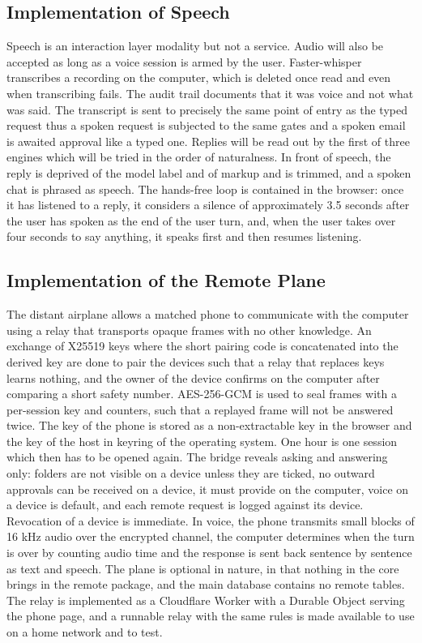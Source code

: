 \documentclass{FastFyp}
\begin{document}
\subsection{Implementation of Speech}
Speech is an interaction layer modality but not a service. Audio will also be accepted as long as a voice session is armed by the user. Faster-whisper transcribes a recording on the computer, which is deleted once read and even when transcribing fails. The audit trail documents that it was voice and not what was said. The transcript is sent to precisely the same point of entry as the typed request thus a spoken request is subjected to the same gates and a spoken email is awaited approval like a typed one. Replies will be read out by the first of three engines which will be tried in the order of naturalness. In front of speech, the reply is deprived of the model label and of markup and is trimmed, and a spoken chat is phrased as speech. The hands-free loop is contained in the browser: once it has listened to a reply, it considers a silence of approximately 3.5 seconds after the user has spoken as the end of the user turn, and, when the user takes over four seconds to say anything, it speaks first and then resumes listening.

\subsection{Implementation of the Remote Plane}
The distant airplane allows a matched phone to communicate with the computer using a relay that transports opaque frames with no other knowledge. An exchange of X25519 keys where the short pairing code is concatenated into the derived key are done to pair the devices such that a relay that replaces keys learns nothing, and the owner of the device confirms on the computer after comparing a short safety number. AES-256-GCM is used to seal frames with a per-session key and counters, such that a replayed frame will not be answered twice. The key of the phone is stored as a non-extractable key in the browser and the key of the host in keyring of the operating system. One hour is one session which then has to be opened again. The bridge reveals asking and answering only: folders are not visible on a device unless they are ticked, no outward approvals can be received on a device, it must provide on the computer, voice on a device is default, and each remote request is logged against its device. Revocation of a device is immediate. In voice, the phone transmits small blocks of 16 kHz audio over the encrypted channel, the computer determines when the turn is over by counting audio time and the response is sent back sentence by sentence as text and speech. The plane is optional in nature, in that nothing in the core brings in the remote package, and the main database contains no remote tables. The relay is implemented as a Cloudflare Worker with a Durable Object serving the phone page, and a runnable relay with the same rules is made available to use on a home network and to test.
\end{document}
